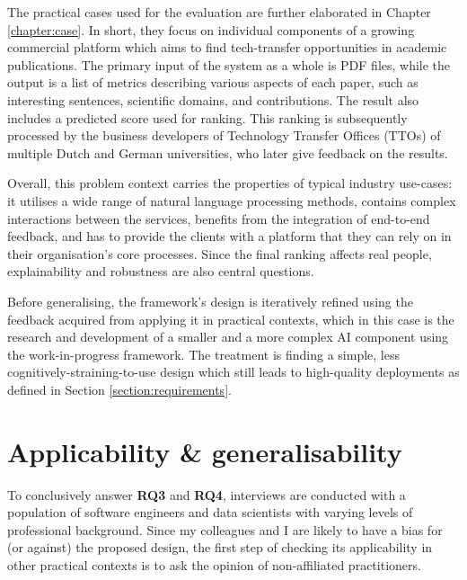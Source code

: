 The practical cases used for the evaluation are further elaborated in Chapter \ref{chapter:case}. In short, they focus on individual components of a growing commercial platform which aims to find tech-transfer opportunities in academic publications. The primary input of the system as a whole is PDF files, while the output is a list of metrics describing various aspects of each paper, such as interesting sentences, scientific domains, and contributions. The result also includes a predicted score used for ranking. This ranking is subsequently processed by the business developers of Technology Transfer Offices (TTOs) of multiple Dutch and German universities, who later give feedback on the results.

Overall, this problem context carries the properties of typical industry use-cases: it utilises a wide range of natural language processing methods, contains complex interactions between the services, benefits from the integration of end-to-end feedback, and has to provide the clients with a platform that they can rely on in their organisation's core processes. Since the final ranking affects real people, explainability and robustness are also central questions.

Before generalising, the framework's design is iteratively refined using the feedback acquired from applying it in practical contexts, which in this case is the research and development of a smaller and a more complex AI component using the work-in-progress framework. The treatment is finding a simple, less cognitively-straining-to-use design which still leads to high-quality deployments as defined in Section \ref{section:requirements}.

\section{Applicability \& generalisability} \label{section:interview-setup}

To conclusively answer \textbf{RQ3} and \textbf{RQ4}, interviews are conducted with a population of software engineers and data scientists with varying levels of professional background. Since my colleagues and I are likely to have a bias for (or against) the proposed design, the first step of checking its applicability in other practical contexts is to ask the opinion of non-affiliated practitioners.

